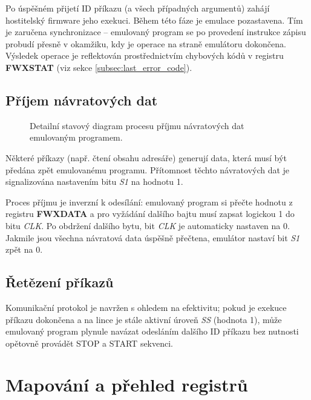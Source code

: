 Po úspěšném přijetí ID příkazu (a všech případných argumentů) zahájí hostitelský firmware jeho
exekuci. Během této fáze je emulace pozastavena. Tím je zaručena synchronizace --
emulovaný program se po provedení instrukce zápisu probudí přesně v okamžiku, kdy je operace na
straně emulátoru dokončena. Výsledek operace je reflektován prostřednictvím chybových kódů v
registru \textbf{FWXSTAT} (viz sekce \ref{subsec:last_error_code}).

\subsection{Příjem návratových dat}

\begin{figure}[htbp]
    \centering
    
    \caption{Detailní stavový diagram procesu příjmu návratových dat emulovaným programem.}
    \label{fig:data_receive_procedure}
\end{figure}

Některé příkazy (např. čtení obsahu adresáře) generují data, která musí být předána zpět emulovanému
programu. Přítomnost těchto návratových dat je signalizována nastavením bitu \emph{S1} na hodnotu 1.

Proces příjmu je inverzní k odesílání: emulovaný program si přečte hodnotu z registru
\textbf{FWXDATA} a pro vyžádání dalšího bajtu musí zapsat logickou 1 do bitu \emph{CLK}. Po obdržení
dalšího bytu, bit \emph{CLK} je automaticky nastaven na 0. Jakmile jsou všechna návratová data
úspěšně přečtena, emulátor nastaví bit \emph{S1} zpět na 0.

\subsection{Řetězení příkazů}

Komunikační protokol je navržen s ohledem na efektivitu; pokud je exekuce příkazu dokončena a na
lince je stále aktivní úroveň \emph{SS} (hodnota 1), může emulovaný program plynule navázat
odesláním dalšího ID příkazu bez nutnosti opětovně provádět STOP a START sekvenci.

\section{Mapování a přehled registrů}

